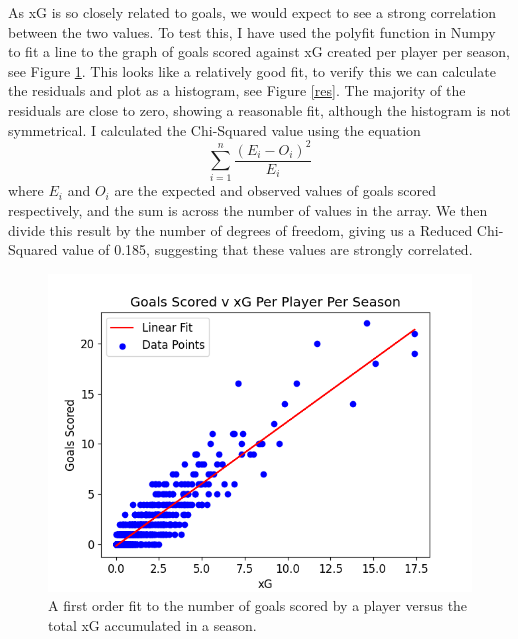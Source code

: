 \documentclass[12pt, a4paper, twocolumn]{article}
\begin{document}
As xG is so closely related to goals, we would expect to see a strong correlation between the two values. To test this, I have used the polyfit function in Numpy to fit a line to the graph of goals scored against xG created per player per season, see Figure \ref{xg_line}. This looks like a relatively good fit, to verify this we can calculate the residuals and plot as a histogram, see Figure \ref{res}. The majority of the residuals are close to zero, showing a reasonable fit, although the histogram is not symmetrical. I calculated the Chi-Squared value using the equation
\begin{equation}
\sum_{i=1}^n \frac{(E_i - O_i)^2}{E_i} 
\end{equation}
where $E_i$ and $O_i$ are the expected and observed values of goals scored respectively, and the sum is across the number of values in the array. We then divide this result by the number of degrees of freedom, giving us a Reduced Chi-Squared value of 0.185, suggesting that these values are strongly correlated.

\begin{figure}
  \includegraphics[width=\linewidth]{../vis/playerStats/goals_v_xg_linear_fit.png}
  \caption{A first order fit to the number of goals scored by a player versus the total xG accumulated in a season.}
  \label{xg_line}
\end{figure}
\end{document}
